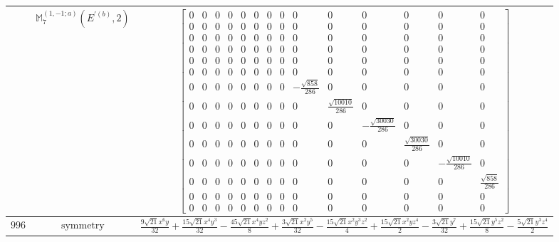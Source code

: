 \documentclass[fleqn,8pt,landscape]{jsarticle}
\begin{document}
\begin{longtable}{ccc}
$  $ & $ \mathbb{M}_{7}^{(1,-1;a)}(E^{\prime(b)},2) $ & $ \begin{bmatrix} 0 & 0 & 0 & 0 & 0 & 0 & 0 & 0 & 0 & 0 & 0 & 0 & 0 & 0 \\ 0 & 0 & 0 & 0 & 0 & 0 & 0 & 0 & 0 & 0 & 0 & 0 & 0 & 0 \\ 0 & 0 & 0 & 0 & 0 & 0 & 0 & 0 & 0 & 0 & 0 & 0 & 0 & 0 \\ 0 & 0 & 0 & 0 & 0 & 0 & 0 & 0 & 0 & 0 & 0 & 0 & 0 & 0 \\ 0 & 0 & 0 & 0 & 0 & 0 & 0 & 0 & 0 & 0 & 0 & 0 & 0 & 0 \\ 0 & 0 & 0 & 0 & 0 & 0 & 0 & 0 & 0 & 0 & 0 & 0 & 0 & 0 \\ 0 & 0 & 0 & 0 & 0 & 0 & 0 & 0 & - \frac{\sqrt{858}}{286} & 0 & 0 & 0 & 0 & 0 \\ 0 & 0 & 0 & 0 & 0 & 0 & 0 & 0 & 0 & \frac{\sqrt{10010}}{286} & 0 & 0 & 0 & 0 \\ 0 & 0 & 0 & 0 & 0 & 0 & 0 & 0 & 0 & 0 & - \frac{\sqrt{30030}}{286} & 0 & 0 & 0 \\ 0 & 0 & 0 & 0 & 0 & 0 & 0 & 0 & 0 & 0 & 0 & \frac{\sqrt{30030}}{286} & 0 & 0 \\ 0 & 0 & 0 & 0 & 0 & 0 & 0 & 0 & 0 & 0 & 0 & 0 & - \frac{\sqrt{10010}}{286} & 0 \\ 0 & 0 & 0 & 0 & 0 & 0 & 0 & 0 & 0 & 0 & 0 & 0 & 0 & \frac{\sqrt{858}}{286} \\ 0 & 0 & 0 & 0 & 0 & 0 & 0 & 0 & 0 & 0 & 0 & 0 & 0 & 0 \\ 0 & 0 & 0 & 0 & 0 & 0 & 0 & 0 & 0 & 0 & 0 & 0 & 0 & 0 \end{bmatrix} $ \\ \hline
$ 996 $ & $ \text{symmetry} $ & $ \frac{9 \sqrt{21} x^{6} y}{32} + \frac{15 \sqrt{21} x^{4} y^{3}}{32} - \frac{45 \sqrt{21} x^{4} y z^{2}}{8} + \frac{3 \sqrt{21} x^{2} y^{5}}{32} - \frac{15 \sqrt{21} x^{2} y^{3} z^{2}}{4} + \frac{15 \sqrt{21} x^{2} y z^{4}}{2} - \frac{3 \sqrt{21} y^{7}}{32} + \frac{15 \sqrt{21} y^{5} z^{2}}{8} - \frac{5 \sqrt{21} y^{3} z^{4}}{2} $ \\

\end{longtable}
\end{document}
